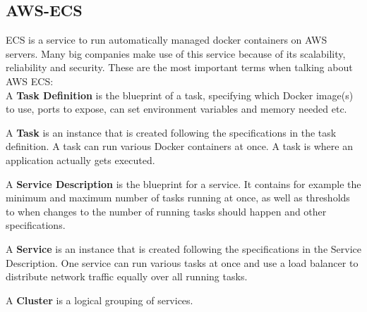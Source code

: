 \subsection{AWS-ECS}
ECS is a service to run automatically managed docker containers on AWS servers. Many big companies make use of this service because of its scalability, reliability and security. \cite{AwsEc2}
These are the most important terms when talking about AWS ECS: \\

A \textbf{Task Definition} is the blueprint of a task, specifying which Docker image(s) to use, ports to expose, can set environment variables and memory needed etc. \cite{CodeCampEcs}

A \textbf{Task} is an instance that is created following the specifications in the task definition. A task can run various Docker containers at once. A task is where an application actually gets executed.

A \textbf{Service Description} is the blueprint for a service. It contains for example the minimum and maximum number of tasks running at once, as well as thresholds to when changes to the number of running tasks should happen and other specifications.

A \textbf{Service} is an instance that is created following the specifications in the Service Description. One service can run various tasks at once and use a load balancer to distribute network traffic equally over all running tasks.

A \textbf{Cluster} is a logical grouping of services. \\

